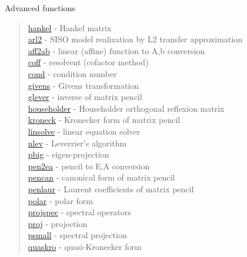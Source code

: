 
















Advanced functions

\begin{quote}
\noindent
\hyperlink{hankel}{hankel} - Hankel matrix \\
\hyperlink{arl2}{arl2} - SISO model realization by L2 transfer approximation \\ 
\hyperlink{aff2ab}{aff2ab} - {linear (affine) function to A,b conversion} \\  
\hyperlink{coff}{coff} - {resolvent (cofactor method)  } \\  
\hyperlink{cond}{cond} - {condition number} \\  
\hyperlink{givens}{givens} - {Givens transformation} \\  
\hyperlink{glever}{glever} - {inverse of matrix pencil} \\  
\hyperlink{householder}{householder} - {Householder orthogonal reflexion matrix} \\  
\hyperlink{kroneck}{kroneck} - {Kronecker form of matrix pencil} \\  
\hyperlink{linsolve}{linsolve} - {linear equation solver} \\  
\hyperlink{nlev}{nlev} - {Leverrier's algorithm} \\  
\hyperlink{pbig}{pbig} - {eigen-projection} \\  
\hyperlink{pen2ea}{pen2ea} - {pencil to E,A conversion} \\  
\hyperlink{pencan}{pencan} - {canonical form of matrix pencil} \\  
\hyperlink{penlaur}{penlaur} - {Laurent coefficients of matrix pencil} \\  
\hyperlink{polar}{polar} - {polar form} \\  
\hyperlink{projspec}{projspec} - {spectral operators} \\  
\hyperlink{proj}{proj} - {projection} \\  
\hyperlink{psmall}{psmall} - {spectral projection} \\  
\hyperlink{quaskro}{quaskro} - {quasi-Kronecker form} \\  

\end{quote}
